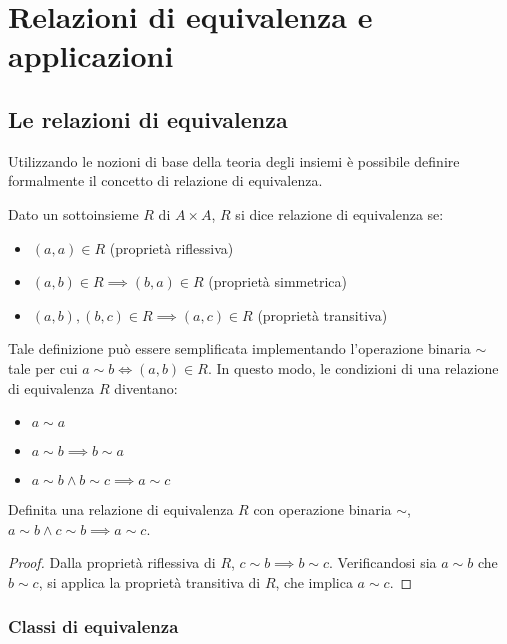 \chapter{Relazioni di equivalenza e applicazioni}

\section{Le relazioni di equivalenza}

Utilizzando le nozioni di base della teoria degli
insiemi è possibile definire formalmente il concetto
di relazione di equivalenza.

Dato un sottoinsieme $R$ di $A \times A$, $R$ si
dice relazione di equivalenza se:

\begin{itemize}
    \item $(a,a) \in R$ (proprietà riflessiva)
    \item $(a,b) \in R \implies (b,a) \in R$ (proprietà simmetrica)
    \item $(a,b), (b,c) \in R \implies (a,c) \in R$ (proprietà transitiva)
\end{itemize}

Tale definizione può essere semplificata
implementando l'operazione binaria $\sim$ tale per cui
$a\sim b \iff (a,b) \in R$. In questo modo, le condizioni
di una relazione di equivalenza $R$ diventano:

\begin{itemize}
    \item $a \sim a$
    \item $a \sim b \implies b \sim a$
    \item $a \sim b \land b \sim c \implies a \sim c$
\end{itemize}

\begin{lemma}
    Definita una relazione di equivalenza $R$ con operazione
    binaria $\sim$, $a \sim b \land c \sim b \implies a \sim c$.
\end{lemma}

\begin{proof}
    Dalla proprietà riflessiva di $R$, $c \sim b \implies b \sim c$.
    Verificandosi sia $a \sim b$ che $b \sim c$, si applica la proprietà
    transitiva di $R$, che implica $a \sim c$.
\end{proof}

\subsection{Classi di equivalenza}

